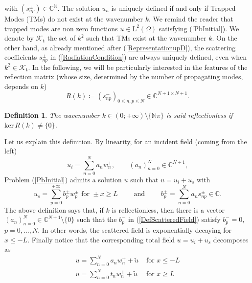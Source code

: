 \documentclass[11pt,a4paper]{report}
\newcommand{\dsp}{\displaystyle}
\newcommand{\mrm}[1]{\mathrm{#1}}
\newcommand{\Cplx}{\mathbb{C}}
\newcommand{\N}{\mathbb{N}}
\newcommand{\mL}{\mrm{L}}
\renewcommand{\ker}{\mrm{ker}}
\newtheorem{definition}[theorem]{Definition}
\begin{document}
with $(s^{\pm}_{np})\in\Cplx^{\N}$. The solution $u_n$ is uniquely defined if and only if Trapped Modes (TMs) do not exist at the wavenumber $k$. We remind the reader that trapped modes are non zero  functions $u\in \mL^2(\Omega)$ satisfying (\ref{PbInitial}). We denote by $\mathscr{K}_{\mrm{t}}$ the set of $k^2$ such that TMs exist at the wavenumber $k$. On the other hand, as already mentioned after (\ref{RepresentationupD}), the scattering coefficients $s^{\pm}_{np}$ in (\ref{RadiationCondition}) are always uniquely defined, even when $k^2\in\mathscr{K}_{\mrm{t}}$. In the following, we will be particularly interested in the features of the reflection matrix  (whose size, determined by the number of propagating modes, depends on $k$)
\begin{equation}\label{reflection matrix} 
R(k)\coloneqq(s^{-}_{np})_{0\le n,p\le N}\in\Cplx^{N+1\times N+1}.
\end{equation} 
\begin{definition} The wavenumber $k\in(0;+\infty)\setminus\{\N\pi\}$ is said reflectionless if $\ker\,R(k)\ne\{0\}$.
\end{definition} 
\noindent Let us explain this definition. By linearity, for an incident field (coming from the left)
\begin{equation}\label{DefIncidentField}
u_i=\sum_{n=0}^Na_n w_n^{+},\qquad (a_n)_{n=0}^N\in\Cplx^{N+1},
\end{equation}
Problem (\ref{PbInitial}) admits a solution $u$ such that $u=u_i+u_s$ with
\begin{equation}\label{DefScatteredField}
u_s=\sum_{p=0}^{+\infty}b_p^{\pm} w_p^{\pm}\mbox{ for }\pm x\ge L\qquad\mbox{ and }\qquad b_p^{\pm}=\sum_{n=0}^Na_{n}s^{\pm}_{np}\in\Cplx.
\end{equation}
The above definition says that, if $k$ is reflectionless, then there is a vector $(a_n)_{n=0}^N\in\Cplx^{N+1}\setminus\{0\}$ such that the $b_p^{-}$ in (\ref{DefScatteredField}) satisfy $b_p^{-}=0$, $p=0,\dots,N$. In other words, the scattered field is exponentially decaying for $x\le -L$. Finally notice that the corresponding total field $u=u_i+u_s$ decomposes as
\begin{equation}\label{DefReflectionlessMode}
\begin{array}{ll}
\dsp u=\sum_{n=0}^{N}a_n w_n^{+}+\tilde{u}&\mbox{ for } x\le -L\\[13pt]
\dsp u=\sum_{n=0}^{N}t_n w_n^{+}+\tilde{u}&\mbox{ for } x\ge L\\
\end{array}
\end{equation}
\end{document}
